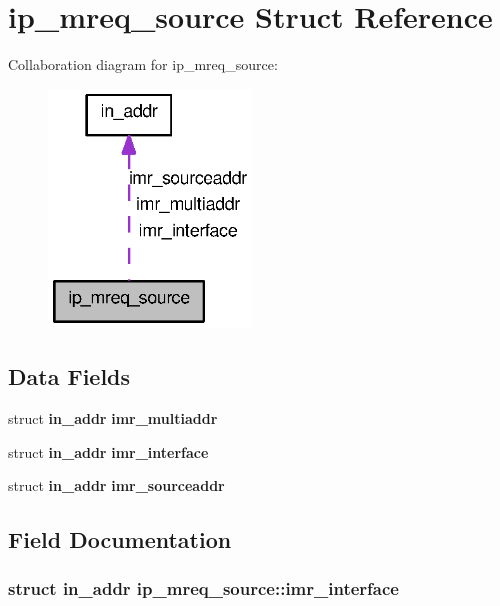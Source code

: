 \section{ip\_\-mreq\_\-source Struct Reference}
\label{structip__mreq__source}


Collaboration diagram for ip\_\-mreq\_\-source:
\nopagebreak
\begin{figure}[H]
\begin{center}
\leavevmode
\includegraphics[width=153pt]{structip__mreq__source__coll__graph}
\end{center}
\end{figure}
\subsection*{Data Fields}
\begin{DoxyCompactItemize}
\item 
struct {\bf in\_\-addr} {\bf imr\_\-multiaddr}
\item 
struct {\bf in\_\-addr} {\bf imr\_\-interface}
\item 
struct {\bf in\_\-addr} {\bf imr\_\-sourceaddr}
\end{DoxyCompactItemize}


\subsection{Field Documentation}
\subsubsection[{imr\_\-interface}]{\setlength{\rightskip}{0pt plus 5cm}struct {\bf in\_\-addr} {\bf ip\_\-mreq\_\-source::imr\_\-interface}}\label{structip__mreq__source_ae2e158e1fa2c20ef2fb9ffe2d23e90a4}
